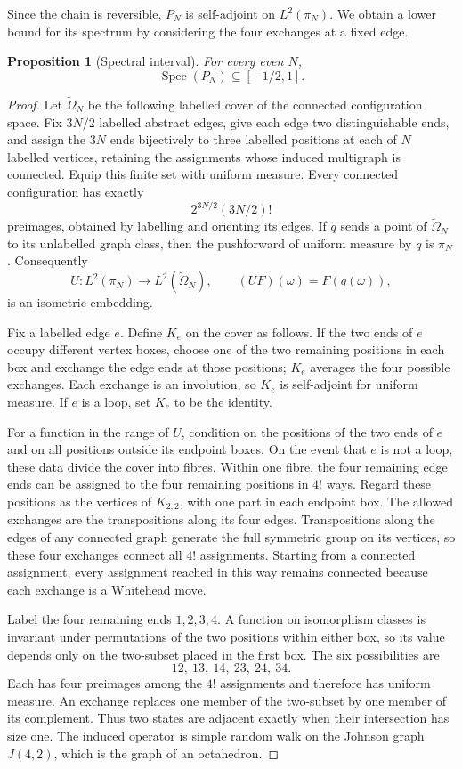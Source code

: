 \documentclass[11pt]{article}
\newcommand{\Spec}{\operatorname{Spec}}
\theoremstyle{plain}
\newtheorem{proposition}[proposition]{Proposition}
\theoremstyle{definition}
\numberwithin{equation}{section}
\begin{document}
Since the chain is reversible, $P_N$ is self-adjoint on $L^2(\pi_N)$.
We obtain a lower bound for its spectrum by considering the four exchanges
at a fixed edge.

\begin{proposition}[Spectral interval]\label{prop:spectral-interval}
For every even $N$,
\[
  \Spec(P_N)\subseteq[-1/2,1].
\]
\end{proposition}

\begin{proof}
Let $\widetilde\Omega_N$ be the following labelled cover of the connected
configuration space.  Fix $3N/2$ labelled abstract edges, give each edge two
distinguishable ends, and assign the $3N$ ends bijectively to three
labelled positions at each of $N$ labelled vertices, retaining the assignments
whose induced multigraph is connected.  Equip this finite set with uniform
measure.  Every connected configuration has
exactly
\[
  2^{3N/2}(3N/2)!
\]
preimages, obtained by labelling and orienting its edges.  If $q$
sends a point of $\widetilde\Omega_N$ to its unlabelled graph class, then the
pushforward of uniform measure by $q$ is $\pi_N$.  Consequently
\[
 U:L^2(\pi_N)\longrightarrow L^2(\widetilde\Omega_N),
 \qquad (UF)(\omega)=F(q(\omega)),
\]
is an isometric embedding.

Fix a labelled edge $e$.  Define $K_e$ on the cover as follows.  If
the two ends of $e$ occupy different vertex boxes, choose one of the two
remaining positions in each box and exchange the edge ends at those positions;
$K_e$ averages the four possible exchanges.  Each exchange is an involution,
so $K_e$ is self-adjoint for uniform measure.  If $e$ is a loop, set $K_e$ to
be the identity.

For a function in the range of $U$, condition on the positions of the two
ends of $e$ and on all positions outside its endpoint boxes.  On the event that
$e$ is not a loop, these data divide the cover into fibres.  Within one fibre,
the four remaining edge ends can be assigned to the four remaining positions in
$4!$ ways.  Regard these positions as the vertices of $K_{2,2}$, with one
part in each endpoint box.  The allowed exchanges are the transpositions along
its four edges.  Transpositions along the edges of any connected graph
generate the full symmetric group on its vertices, so these four exchanges
connect all $4!$ assignments.  Starting from a connected assignment, every
assignment reached in this way remains connected because each exchange is a
Whitehead move.

Label the four remaining ends $1,2,3,4$.  A function on isomorphism classes is
invariant under permutations of the two positions within either box, so its
value depends only on the two-subset placed in the first box.  The six
possibilities are
\[
  12,\ 13,\ 14,\ 23,\ 24,\ 34.
\]
Each has four preimages among the $4!$ assignments and therefore has uniform
measure.  An exchange replaces one member of the two-subset by one member of
its complement.  Thus two states are adjacent exactly when their intersection
has size one.  The induced operator is simple random walk on the Johnson graph
$J(4,2)$, which is the graph of an octahedron.


\end{proof}
\end{document}
